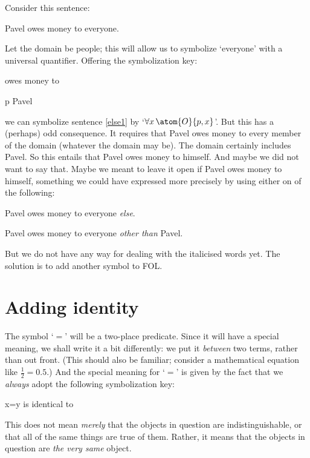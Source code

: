 Consider this sentence:
\begin{earg}
\item[\ex{else1}] Pavel owes money to everyone.
\end{earg}
Let the domain be people; this will allow us to symbolize `everyone' with a universal quantifier. Offering the symbolization key:
	\begin{ekey}
		\item[\atom{O}{x,y}]  owes money to 
		\item[p] Pavel
	\end{ekey}
we can symbolize sentence \ref{else1} by `$\forall x\, \atom{O}{p,x}$'. But this has a (perhaps) odd consequence. It requires that Pavel owes money to every member of the domain (whatever the domain may be). The domain certainly includes Pavel. So this entails that Pavel owes money to himself. And maybe we did not want to say that. Maybe we meant to leave it open if Pavel owes money to himself, something we could have expressed more precisely by using either on of the following:
	\begin{earg}
		\item[\ex{else1b}] Pavel owes money to everyone \emph{else}.
		\item[\ex{else1c}] Pavel owes money to everyone \emph{other than} Pavel.
	\end{earg}
But we do not have any way for dealing with the italicised words yet. The solution is to add another symbol to FOL.

\section{Adding identity}

The symbol `$=$' will be a two-place predicate. Since it will have a special meaning, we shall write it a bit differently: we put it \emph{between} two terms, rather than out front. (This should also be familiar; consider a mathematical equation like $\frac{1}{2} = 0.5$.) And the special meaning for `$=$' is given by the fact that we \emph{always} adopt the following symbolization key: 
	\begin{ekey}
		\item[x=y]  is identical to \gap{y}
	\end{ekey}
This does not mean \emph{merely} that the objects in question are indistinguishable, or that all of the same things are true of them. Rather, it means that the objects in question are \emph{the very same} object.

